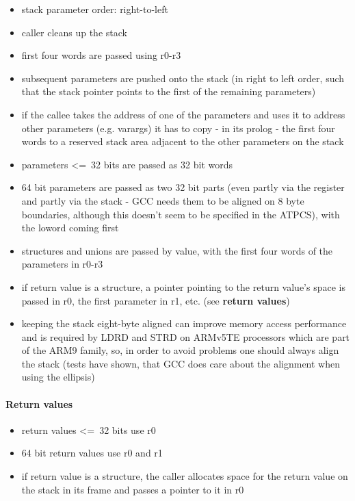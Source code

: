 \begin{itemize}
\item stack parameter order: right-to-left
\item caller cleans up the stack
\item first four words are passed using r0-r3
\item subsequent parameters are pushed onto the stack (in right to left order, such that the stack pointer points to the first of the remaining parameters)
\item if the callee takes the address of one of the parameters and uses it to address other parameters (e.g. varargs) it has to copy - in its prolog - the first four words to a reserved stack area adjacent to the other parameters on the stack
\item parameters \textless=\ 32 bits are passed as 32 bit words
\item 64 bit parameters are passed as two 32 bit parts (even partly via the register and partly via the stack - GCC needs them to be aligned on 8 byte boundaries, although this doesn't seem to be specified in the ATPCS), with the loword coming first
\item structures and unions are passed by value, with the first four words of the parameters in r0-r3
\item if return value is a structure, a pointer pointing to the return value's space is passed in r0, the first parameter in r1, etc. (see {\bf return values})
\item keeping the stack eight-byte aligned can improve memory access performance and is required by LDRD and STRD on ARMv5TE processors which are part of the ARM9 family, so, in order to avoid problems one should always align the stack (tests have shown, that GCC does care about the alignment when using the ellipsis)
\end{itemize}


\paragraph{Return values}
\begin{itemize}
\item return values \textless=\ 32 bits use r0
\item 64 bit return values use r0 and r1
\item if return value is a structure, the caller allocates space for the return value on the stack in its frame and passes a pointer to it in r0
\end{itemize}

